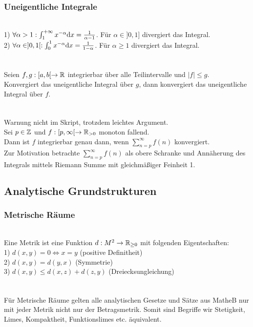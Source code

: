 \subsubsection*{Uneigentliche Integrale}
 \\
1) \(\forall \alpha > 1: \int_{1}^{+\infty} x^{-\alpha} \text d x = \frac{1}{\alpha - 1}\). \puffer Für \(\alpha \in {]0{,}1]}\) divergiert das Integral. \\
2) \(\forall \alpha \in ]0,1[: \int_{0}^{1}x^{-\alpha} \text d x = \frac{1}{1 - \alpha}\). \puffer Für \(\alpha \ge 1\) divergiert das Integral. \\ \\
 \\
Seien \(f,g: [a,b[ \rightarrow \mathbb R\) integrierbar über alle Teilintervalle und \(|f| \le g\). \\
Konvergiert das uneigentliche Integral über \(g\), dann konvergiert das uneigentliche Integral über \(f\). \\ \\
 \\
Warnung nicht im Skript, trotzdem leichtes Argument. \\
Sei \(p \in \mathbb Z\) und \(f : [p, \infty[ \rightarrow \mathbb R_{> 0}\) monoton fallend. \\
Dann ist \(f\) integrierbar genau dann, wenn \(\sum_{n = p}^{\infty} f(n)\) konvergiert. \\
Zur Motivation betrachte \(\sum_{n = p}^{\infty} f(n)\) als obere Schranke und Annäherung des Integrals mittels Riemann Summe mit gleichmäßiger Feinheit 1.
\subsection*{Analytische Grundstrukturen}
\subsubsection*{Metrische Räume}
 \\
Eine Metrik ist eine Funktion \(d : M^2 \rightarrow \mathbb R_{\ge 0}\) mit folgenden Eigentschaften:\\
1) \(d(x,y) = 0 \Longleftrightarrow x = y\) \puffer \puffer \gap \gap (positive Definitheit) \\
2) \(d(x,y) = d(y,x)\) \puffer \puffer \puffer \puffer \gap \gap \gap (Symmetrie) \\
3) \(d(x,y) \le d(x,z) + d(z,y)\) \puffer (Dreiecksungleichung) \\ \\
 \\
Für Metrische Räume gelten alle analytischen Gesetze und Sätze aus MatheB nur mit jeder Metrik nicht nur der Betragsmetrik.
Somit sind Begriffe wir Stetigkeit, Limes, Kompaktheit, Funktionslimes etc. äquivalent.
